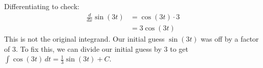 \documentclass[main]{subfiles}
\begin{document}
\begin{enumerate}[resume,topsep=0pt]
\begin{enumerate}[topsep=0pt]
\begin{solution}
        Differentiating to check:
        \begin{align*}
            \frac{d}{dx} \sin(3t) &= \cos(3t) \cdot 3 \\
            & = 3\cos(3t)\
        \end{align*}
        This is not the original integrand. Our initial guess 
        $\sin(3t)$ was off by a factor of $3$. To fix this, we can
        divide our initial guess by $3$ to get 
        $\displaystyle \int \cos(3t)\,dt
        = \boxed{\tfrac{1}{3}\sin(3t)+C.}$
    \end{solution}
  \end{enumerate}
\end{enumerate}
\end{document}
